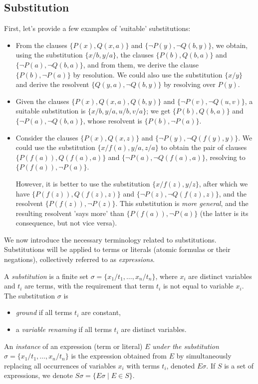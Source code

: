 \subsection{Substitution}

First, let's provide a few examples of 'suitable' substitutions:

\begin{example}\label{example:substitutions}
\begin{itemize}
    \item From the clauses $\{P(x),Q(x,a)\}$ and $\{\neg P(y),\neg Q(b,y)\}$, we obtain, using the substitution $\{x/b,y/a\}$, the clauses $\{P(b),Q(b,a)\}$ and $\{\neg P(a),\neg Q(b,a)\}$, and from them, we derive the clause $\{P(b),\neg P(a)\}$ by resolution. We could also use the substitution $\{x/y\}$ and derive the resolvent $\{Q(y,a),\neg Q(b,y)\}$ by resolving over $P(y)$.
    \item Given the clauses $\{P(x),Q(x,a),Q(b,y)\}$ and $\{\neg P(v),\neg Q(u,v)\}$, a suitable substitution is $\{x/b,y/a,u/b,v/a\}$; we get $\{P(b),Q(b,a)\}$ and $\{\neg P(a),\neg Q(b,a)\}$, whose resolvent is $\{P(b),\neg P(a)\}$.
    \item Consider the clauses $\{P(x),Q(x,z)\}$ and $\{\neg P(y),\neg Q(f(y),y)\}$. We could use the substitution $\{x/f(a),y/a,z/a\}$ to obtain the pair of clauses $\{P(f(a)),Q(f(a),a)\}$ and $\{\neg P(a),\neg Q(f(a),a)\}$, resolving to $\{P(f(a)),\neg P(a)\}$.

    However, it is better to use the substitution $\{x/f(z),y/z\}$, after which we have $\{P(f(z)),Q(f(z),z)\}$ and $\{\neg P(z),\neg Q(f(z),z)\}$, and the resolvent $\{P(f(z)),\neg P(z)\}$. This substitution is \emph{more general}, and the resulting resolvent 'says more' than $\{P(f(a)),\neg P(a)\}$ (the latter is its consequence, but not vice versa).
\end{itemize}
\end{example}

We now introduce the necessary terminology related to substitutions. Substitutions will be applied to terms or literals (atomic formulas or their negations), collectively referred to as \emph{expressions}.

\begin{definition}[Substitution]
    A \emph{substitution} is a finite set $\sigma=\{x_1/t_1,\dots,x_n/t_n\}$, where $x_i$ are distinct variables and $t_i$ are terms, with the requirement that term $t_i$ is not equal to variable $x_i$. The substitution $\sigma$ is 
    \begin{itemize}
        \item \emph{ground} if all terms $t_i$ are constant,
        \item a \emph{variable renaming} if all terms $t_i$ are distinct variables.
    \end{itemize}
    An \emph{instance} of an expression (term or literal) $E$ \emph{under the substitution $\sigma=\{x_1/t_1,\dots,x_n/t_n\}$} is the expression obtained from $E$ by simultaneously replacing all occurrences of variables $x_i$ with terms $t_i$, denoted $E\sigma$. If $S$ is a set of expressions, we denote $S\sigma=\{E\sigma\mid E\in S\}$.
\end{definition}


